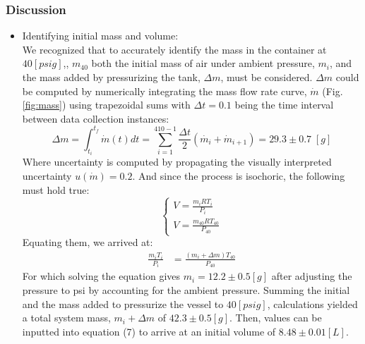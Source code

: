 \documentclass[12pt]{article}
\begin{document}
\subsubsection*{Discussion}
\begin{itemize}
    \item Identifying initial mass and volume:\\
    We recognized that to accurately identify the mass in the container at $40[psig]$,, $m_{40}$ both the initial mass of air under ambient pressure, $m_i$, and the mass added by pressurizing the tank, $\Delta m$, must be considered. $\Delta m$ could be computed by numerically integrating the mass flow rate curve, $\dot{m}$ (Fig. \ref{fig:mass}) using trapezoidal sums with $\Delta t=0.1$ being the time interval between data collection instances:
    \begin{equation}
        \Delta m = \int_{t_i}^{t_f}\dot{m}(t)dt = \sum_{i=1}^{410-1}\frac{\Delta t}{2}(\dot{m_i}+\dot{m}_{i+1})= 29.3 \pm 0.7 \; [g]
    \end{equation}
    Where uncertainty is computed by propagating the visually interpreted uncertainty $u(\dot{m})=0.2$.  And since the process is isochoric, the following must hold true:
    \begin{equation}
        \begin{cases}
            V = \frac{m_iRT_i}{P_i} \\
            V = \frac{m_{40}RT_{40}}{P_{40}}
        \end{cases}
    \end{equation}
    Equating them, we arrived at:
    \begin{align}
        \frac{m_iT_i}{P_i} &= \frac{(m_{i}+\Delta m )T_{40}}{P_{40}}
    \end{align}
    For which solving the equation gives $m_i = 12.2\pm0.5[g]$ after adjusting the pressure to psi by accounting for the ambient pressure. Summing the initial and the mass added to pressurize the vessel to $40 [psig]$, calculations yielded a total system mass, $m_i+\Delta m$ of $42.3\pm0.5[g]$. Then, values can be inputted into equation (7) to arrive at an initial volume of $8.48\pm0.01[L]$.

\end{itemize}
\end{document}
